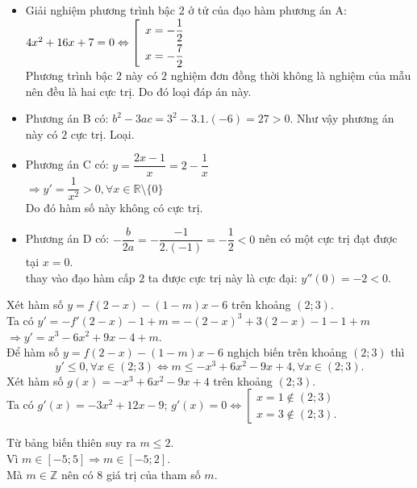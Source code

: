 \begin{Solbook}{13}
 \par \noindent  \begin {itemize} \item Giải nghiệm phương trình bậc 2 ở tử của đạo hàm phương án A: $4x^2+16x+7=0 \Leftrightarrow \left [\begin {array}{l} x=-\dfrac {1}{2}\smallskip \\ x=-\dfrac {7}{2} \end {array}\right .$\\ Phương trình bậc $2$ này có $2$ nghiệm đơn đồng thời không là nghiệm của mẫu nên đều là hai cực trị. Do đó loại đáp án này. \item Phương án B có: $b^2-3ac=3^2-3.1.(-6)=27>0$. Như vậy phương án này có $2$ cực trị. Loại. \item Phương án C có: $y=\dfrac {2x-1}{x}=2-\dfrac {1}{x}$\\ $\Rightarrow y'=\dfrac {1}{x^2}>0, \forall x \in \mathbb {R}\setminus \{0\}$\\ Do đó hàm số này không có cực trị. \item Phương án D có: $-\dfrac {b}{2a}=-\dfrac {-1}{2.(-1)}=-\dfrac {1}{2}<0$ nên có một cực trị đạt được tại $x=0$. \\ thay vào đạo hàm cấp $2$ ta được cực trị này là cực đại: $y''(0)=-2<0$. \end {itemize}  \par \noindent \selectC \hfill \qedEX 
\end{Solbook}
\begin{Solbook}{14}
 \par \noindent  Xét hàm số $y=f(2-x)-(1-m) x-6$ trên khoảng $(2 ; 3)$.\\ Ta có $y'=-f'(2-x)-1+m=-(2-x)^{3}+3(2-x)-1-1+m$ $\Rightarrow y'=x^{3}-6 x^{2}+9 x-4+m$.\\ Để hàm số $y=f(2-x)-(1-m) x-6$ nghịch biến trên khoảng $(2 ; 3)$ thì \[ y' \leq 0, \forall x \in (2 ; 3) \Leftrightarrow m \leqslant -x^{3}+6 x^{2}-9 x+4, \forall x \in (2 ; 3).\] Xét hàm số $g(x)=-x^{3}+6 x^{2}-9 x+4$ trên khoảng $(2 ; 3)$.\\ Ta có $g'(x)=-3 x^{2}+12 x-9$; $g'(x)=0 \Leftrightarrow \left [ \begin {array}{l}x=1 \notin (2 ; 3) \\ x=3 \notin (2 ; 3).\end {array}\right .$ \begin {center}  \end {center} Từ bảng biến thiên suy ra $m \leqslant 2$.\\ Vì $m \in [-5 ; 5] \Rightarrow m \in [-5 ; 2]$. \\ Mà $ m \in \mathbb {Z}$ nên có $8$ giá trị của tham số $m$.  \par \noindent \selectC \hfill \qedEX 
\end{Solbook}
